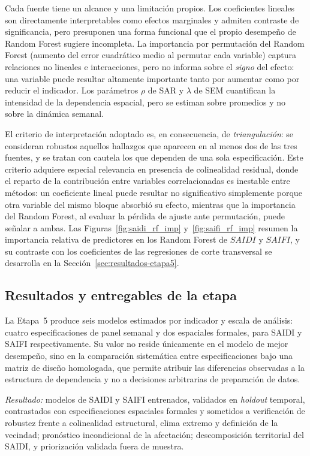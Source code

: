 Cada fuente tiene un alcance y una limitación propios. Los coeficientes lineales son directamente interpretables como efectos marginales y admiten contraste de significancia, pero presuponen una forma funcional que el propio desempeño de Random Forest sugiere incompleta. La importancia por permutación del Random Forest (aumento del error cuadrático medio al permutar cada variable) captura relaciones no lineales e interacciones, pero no informa sobre el \textit{signo} del efecto: una variable puede resultar altamente importante tanto por aumentar como por reducir el indicador. Los parámetros $\rho$ de SAR y $\lambda$ de SEM cuantifican la intensidad de la dependencia espacial, pero se estiman sobre promedios y no sobre la dinámica semanal.

El criterio de interpretación adoptado es, en consecuencia, de \textit{triangulación}: se consideran robustos aquellos hallazgos que aparecen en al menos dos de las tres fuentes, y se tratan con cautela los que dependen de una sola especificación. Este criterio adquiere especial relevancia en presencia de colinealidad residual, donde el reparto de la contribución entre variables correlacionadas es inestable entre métodos: un coeficiente lineal puede resultar no significativo simplemente porque otra variable del mismo bloque absorbió su efecto, mientras que la importancia del Random Forest, al evaluar la pérdida de ajuste ante permutación, puede señalar a ambas. Las Figuras~\ref{fig:saidi_rf_imp} y~\ref{fig:saifi_rf_imp} resumen la importancia relativa de predictores en los Random Forest de $SAIDI$ y $SAIFI$, y su contraste con los coeficientes de las regresiones de corte transversal se desarrolla en la Sección~\ref{sec:resultados-etapa5}.

\subsection{Resultados y entregables de la etapa}
\label{sec:resultados_etapa5_met}
La Etapa~5 produce seis modelos estimados por indicador y escala de análisis: cuatro especificaciones de panel semanal y dos espaciales formales, para SAIDI y SAIFI respectivamente. Su valor no reside únicamente en el modelo de mejor desempeño, sino en la comparación sistemática entre especificaciones bajo una matriz de diseño homologada, que permite atribuir las diferencias observadas a la estructura de dependencia y no a decisiones arbitrarias de preparación de datos.

\textit{Resultado:} modelos de SAIDI y SAIFI entrenados, validados en \emph{holdout} temporal, contrastados con especificaciones espaciales formales y sometidos a verificación de robustez frente a colinealidad estructural, clima extremo y definición de la vecindad; pronóstico incondicional de la afectación; descomposición territorial del SAIDI, y priorización validada fuera de muestra.

